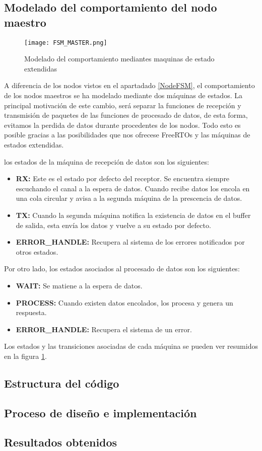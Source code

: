 	\subsection{Modelado del comportamiento del nodo maestro}
	
	\begin{figure}[!h]
		\texttt{[image: FSM\_MASTER.png]}
		\caption{Modelado del comportamiento mediantes maquinas de estado extendidas}
		
		\label{fig:MasterFSM}
	\end{figure}
	
	A diferencia de los nodos vistos en el apartadado \ref{NodeFSM}, el comportamiento de los nodos maestros se ha modelado mediante dos máquinas de estados. La principal motivación de este cambio, será separar la funciones de recepción y transmisión de paquetes de las funciones de procesado de datos, de esta forma, evitamos la perdida de datos durante procedentes de los nodos. Todo esto es posible gracias a las posibilidades que nos ofrecese FreeRTOs y las máquinas de estados extendidas.
	
	los estados de la máquina de recepción de datos son los siguientes:
	
	\begin{itemize}
		\item \textbf{RX: }Este es el estado por defecto del receptor. Se encuentra siempre escuchando el canal a la espera de datos. Cuando recibe datos los encola en una cola circular y avisa a la segunda máquina de la prescencia de datos.
		\item \textbf{TX: }Cuando la segunda máquina notifica la existencia de datos en el buffer de salida, esta envía los datos y vuelve a su estado por defecto.
		\item \textbf{ERROR\_HANDLE: } Recupera al sistema de los errores notificados por otros estados.
	\end{itemize}
	
	Por otro lado, los estados asociados al procesado de datos son los siguientes:
	
	\begin{itemize}
		\item \textbf{WAIT: }Se matiene a la espera de datos.
		\item \textbf{PROCESS: }Cuando existen datos encolados, los procesa y genera un respuesta.
		\item \textbf{ERROR\_HANDLE: }Recupera el sistema de un error.
	\end{itemize}
	
	Los estados y las transiciones asociadas de cada máquina se pueden ver resumidos en la figura \ref{fig:MasterFSM}.
	
	\subsection{Estructura del código}
	\subsection{Proceso de diseño e implementación}
	\subsection{Resultados obtenidos}
	
	
	